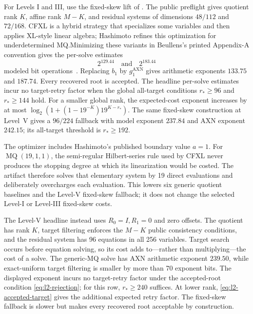 \documentclass[11pt]{article}
\begin{document}
For Levels I and III, use the fixed-skew lift of .  The
public preflight gives quotient rank $K$, affine rank $M-K$, and residual
systems of dimensions $48/112$ and $72/168$.  CFXL is a hybrid strategy
that specializes some variables and then applies XL-style linear algebra;
Hashimoto refines this optimization for underdetermined MQ.\@  Minimizing these
variants in Beullens's printed Appendix-A convention gives the per-solve
estimates
\begin{equation}\label{eq:fixed-skew-costs}
 2^{129.44}\quad\text{and}\quad2^{183.44}
\end{equation}
modeled bit operations~\cite{Beullens2024SNOVA,Hashimoto2023}.  Replacing
$b_1$ by $g_1^{\mathrm{AXN}}$ gives arithmetic exponents $133.75$ and $187.74$.
Every recovered root is accepted.  The headline per-solve estimates incur
no target-retry factor when the global all-target conditions $r_*\ge96$ and
$r_*\ge144$ hold.  For a smaller
global rank, the expected-cost exponent increases by at most
$\log_2(1+(1-19^{-K})19^{K-r_*})$.  The same fixed-skew construction at
Level~V gives a $96/224$ fallback with model exponent $237.84$ and AXN exponent
$242.15$; its all-target threshold is $r_*\ge192$.

The optimizer includes Hashimoto's published boundary value $a=1$.  For
$\operatorname{MQ}(19,1,1)$, the semi-regular Hilbert-series rule used by CFXL
never produces the stopping degree at which its linearization would be costed.
The artifact therefore solves that elementary system by 19 direct evaluations
and deliberately overcharges each evaluation.  This
lowers six generic quotient baselines and the Level-V fixed-skew fallback; it
does not change the selected Level-I or Level-III fixed-skew costs.

The Level-V headline instead uses $R_0=I,R_1=0$ and zero offsets.  The quotient
has rank $K$, target filtering enforces the $M-K$ public consistency
conditions, and the residual system has 96 equations in all 256 variables.
Target search occurs before equation solving, so its cost adds to---rather than
multiplying---the cost of a solve.  The generic-MQ solve has AXN arithmetic
exponent $239.50$, while exact-uniform target filtering is smaller by more than
70 exponent bits.  The displayed exponent incurs no target-retry factor under
the accepted-root condition \eqref{eq:l2-rejection}; for this row, $r_*\ge240$
suffices.  At lower rank, \eqref{eq:l2-accepted-target} gives the additional expected retry factor.
The fixed-skew fallback is slower but makes every recovered root acceptable by
construction.
\end{document}
